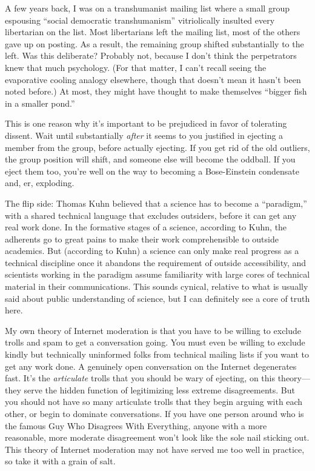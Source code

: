 {
 A few years back, I was on a transhumanist mailing list where a
small group espousing ``social democratic
transhumanism'' vitriolically insulted every
libertarian on the list. Most libertarians left the mailing list, most
of the others gave up on posting. As a result, the remaining group
shifted substantially to the left. Was this deliberate? Probably not,
because I don't think the perpetrators knew that much
psychology. (For that matter, I can't recall seeing the
evaporative cooling analogy elsewhere, though that
doesn't mean it hasn't been noted
before.) At most, they might have thought to make themselves
``bigger fish in a smaller pond.''}

{
 This is one reason why it's important to be
prejudiced in favor of tolerating dissent. Wait until substantially
\textit{after} it seems to you justified in ejecting a member from the
group, before actually ejecting. If you get rid of the old outliers,
the group position will shift, and someone else will become the
oddball. If you eject them too, you're well on the way
to becoming a Bose-Einstein condensate and, er, exploding.}

{
 The flip side: Thomas Kuhn believed that a science has to become a
``paradigm,'' with a shared
technical language that excludes outsiders, before it can get any real
work done. In the formative stages of a science, according to Kuhn, the
adherents go to great pains to make their work comprehensible to
outside academics. But (according to Kuhn) a science can only make real
progress as a technical discipline once it abandons the requirement of
outside accessibility, and scientists working in the paradigm assume
familiarity with large cores of technical material in their
communications. This sounds cynical, relative to what is usually said
about public understanding of science, but I can definitely see a core
of truth here.}

{
 My own theory of Internet moderation is that you have to be
willing to exclude trolls and spam to get a conversation going. You
must even be willing to exclude kindly but technically uninformed folks
from technical mailing lists if you want to get any work done. A
genuinely open conversation on the Internet degenerates fast.
It's the \textit{articulate} trolls that you should be
wary of ejecting, on this theory---they serve the hidden function of
legitimizing less extreme disagreements. But you should not have so
many articulate trolls that they begin arguing with each other, or
begin to dominate conversations. If you have one person around who is
the famous Guy Who Disagrees With Everything, anyone with a more
reasonable, more moderate disagreement won't look like
the sole nail sticking out. This theory of Internet moderation may not
have served me too well in practice, so take it with a grain of salt.}

